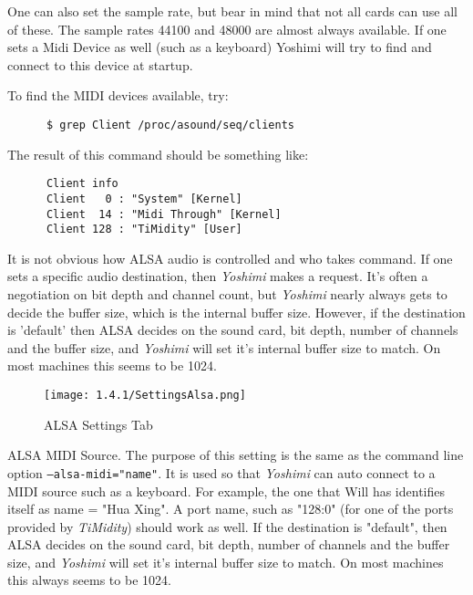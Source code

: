    One can also set the sample rate, but bear in mind that not all cards can use
   all of these.  The sample rates 44100 and 48000 are almost always available.
   If one sets a Midi Device as well (such as a keyboard) Yoshimi will try to
   find and connect to this device at startup.

   To find the MIDI devices available, try:

   \begin{verbatim}
      $ grep Client /proc/asound/seq/clients
   \end{verbatim}

   The result of this command should be something like:

   \begin{verbatim}
      Client info
      Client   0 : "System" [Kernel]
      Client  14 : "Midi Through" [Kernel]
      Client 128 : "TiMidity" [User]
   \end{verbatim}

   It is not obvious how ALSA audio is controlled and who takes command.  If
   one sets a specific audio destination, then \textsl{Yoshimi} makes a
   request.  It's often a negotiation on bit depth and channel count, but
   \textsl{Yoshimi} nearly always gets to decide the buffer size, which is the
   internal buffer size.  However, if the destination is 'default' then ALSA
   decides on the sound card, bit depth, number of channels and the buffer
   size, and \textsl{Yoshimi} will set it's internal buffer size to match.  On
   most machines this seems to be 1024.

\begin{figure}[H]
   \centering
   \texttt{[image: 1.4.1/SettingsAlsa.png]}
   \caption[ALSA Settings]{ALSA Settings Tab}
   \label{fig:yoshimi_settings_alsa_tab}
\end{figure}

   \setcounter{ItemCounter}{0}      %

   ALSA MIDI Source.
   The purpose of this setting is the same as the command line option
   \texttt{--alsa-midi="name"}.
   It is used so that \textsl{Yoshimi} can auto connect to a MIDI source
   such as a keyboard.  For example, the one that Will has identifies itself
   as name = "Hua Xing".
   A port name, such as "128:0" (for one of the ports provided by
   \textsl{TiMidity}) should work as well.
   If the destination is "default",
   then ALSA decides on the sound card, bit depth, number of channels and the
   buffer size, and \textsl{Yoshimi} will set it's internal buffer size to
   match.  On most machines this always seems to be 1024.

